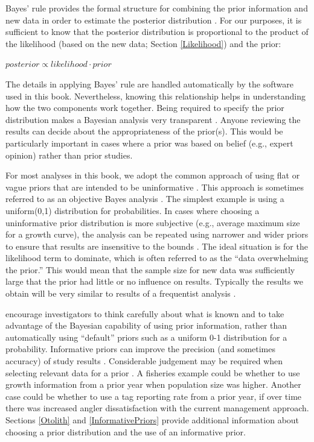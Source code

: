 \documentclass[
]{krantz}
\begin{document}
Bayes' rule provides the formal structure for combining the prior information and new data in order to estimate the posterior distribution \citep{link.etal_2002, kéry.schaub_2011}. For our purposes, it is sufficient to know that the posterior distribution is proportional to the product of the likelihood (based on the new data; Section \ref{Likelihood}) and the prior:

\(posterior \propto likelihood \cdot prior\)

The details in applying Bayes' rule are handled automatically by the software used in this book. Nevertheless, knowing this relationship helps in understanding how the two components work together. Being required to specify the prior distribution makes a Bayesian analysis very transparent \citep{kéry.schaub_2011}. Anyone reviewing the results can decide about the appropriateness of the prior(s). This would be particularly important in cases where a prior was based on belief (e.g., expert opinion) rather than prior studies.

For most analyses in this book, we adopt the common approach of using flat or vague priors that are intended to be uninformative \citep{royle.dorazio_2008, kéry.schaub_2011}. This approach is sometimes referred to as an objective Bayes analysis \citep{link.etal_2002}. The simplest example is using a uniform(0,1) distribution for probabilities. In cases where choosing a uninformative prior distribution is more subjective (e.g., average maximum size for a growth curve), the analysis can be repeated using narrower and wider priors to ensure that results are insensitive to the bounds \citep{kéry.schaub_2011}. The ideal situation is for the likelihood term to dominate, which is often referred to as the ``data overwhelming the prior.'' This would mean that the sample size for new data was sufficiently large that the prior had little or no influence on results. Typically the results we obtain will be very similar to results of a frequentist analysis \citep{link.etal_2002, mccarthy2007, kéry_2010, kéry.schaub_2011}.

\citet{banner.etal_2020} encourage investigators to think carefully about what is known and to take advantage of the Bayesian capability of using prior information, rather than automatically using ``default'' priors such as a uniform 0-1 distribution for a probability. Informative priors can improve the precision (and sometimes accuracy) of study results \citep[e.g.,][]{doll.jacquemin_2018}. Considerable judgement may be required when selecting relevant data for a prior \citep{lunn.etal2012}. A fisheries example could be whether to use growth information from a prior year when population size was higher. Another case could be whether to use a tag reporting rate from a prior year, if over time there was increased angler dissatisfaction with the current management approach. Sections \ref{Otolith} and \ref{InformativePriors} provide additional information about choosing a prior distribution and the use of an informative prior.
\end{document}
